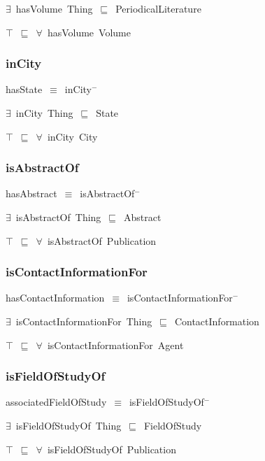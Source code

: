 \documentclass{article}
\begin{document}
\ensuremath{\exists}~hasVolume~Thing~\ensuremath{\sqsubseteq}~PeriodicalLiterature

\ensuremath{\top}~\ensuremath{\sqsubseteq}~\ensuremath{\forall}~hasVolume~Volume

\subsubsection*{inCity}

hasState~\ensuremath{\equiv}~inCity\ensuremath{^-}

\ensuremath{\exists}~inCity~Thing~\ensuremath{\sqsubseteq}~State

\ensuremath{\top}~\ensuremath{\sqsubseteq}~\ensuremath{\forall}~inCity~City

\subsubsection*{isAbstractOf}

hasAbstract~\ensuremath{\equiv}~isAbstractOf\ensuremath{^-}

\ensuremath{\exists}~isAbstractOf~Thing~\ensuremath{\sqsubseteq}~Abstract

\ensuremath{\top}~\ensuremath{\sqsubseteq}~\ensuremath{\forall}~isAbstractOf~Publication

\subsubsection*{isContactInformationFor}

hasContactInformation~\ensuremath{\equiv}~isContactInformationFor\ensuremath{^-}

\ensuremath{\exists}~isContactInformationFor~Thing~\ensuremath{\sqsubseteq}~ContactInformation

\ensuremath{\top}~\ensuremath{\sqsubseteq}~\ensuremath{\forall}~isContactInformationFor~Agent

\subsubsection*{isFieldOfStudyOf}

associatedFieldOfStudy~\ensuremath{\equiv}~isFieldOfStudyOf\ensuremath{^-}

\ensuremath{\exists}~isFieldOfStudyOf~Thing~\ensuremath{\sqsubseteq}~FieldOfStudy

\ensuremath{\top}~\ensuremath{\sqsubseteq}~\ensuremath{\forall}~isFieldOfStudyOf~Publication
\end{document}
